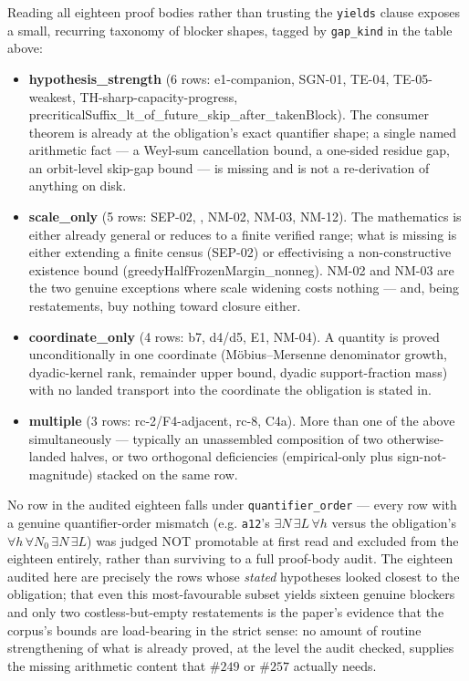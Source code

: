 \documentclass[11pt]{article}
\DeclareRobustCommand{\breakcode}[1]{\seqsplit{#1}}
\theoremstyle{breakplain}
\theoremstyle{breakdefinition}
\theoremstyle{breakdefinition}
\begin{document}
Reading all eighteen proof bodies rather than trusting the \texttt{yields}
clause exposes a small, recurring taxonomy of blocker shapes, tagged by
\texttt{gap\_kind} in the table above:

\begin{itemize}[nosep]
\item \textbf{hypothesis\_strength} (6 rows: e1-companion, SGN-01, TE-04,
TE-05-weakest, TH-sharp-capacity-progress,
precriticalSuffix\_lt\_of\_future\_skip\_after\_takenBlock). The consumer
theorem is already at the obligation's exact quantifier shape; a single
named arithmetic fact — a Weyl-sum cancellation bound, a one-sided residue
gap, an orbit-level skip-gap bound — is missing and is not a re-derivation
of anything on disk.
\item \textbf{scale\_only} (5 rows: SEP-02, \texttt{\breakcode{greedyHalfFrozenMargin\_nonneg}},
NM-02, NM-03, NM-12). The mathematics is either already general or reduces
to a finite verified range; what is missing is either extending a finite
census (SEP-02) or effectivising a non-constructive existence bound
(greedyHalfFrozenMargin\_nonneg). NM-02 and NM-03 are the two genuine
exceptions where scale widening costs nothing — and, being restatements, buy
nothing toward closure either.
\item \textbf{coordinate\_only} (4 rows: b7, d4/d5, E1, NM-04). A quantity
is proved unconditionally in one coordinate (Möbius--Mersenne denominator
growth, dyadic-kernel rank, remainder upper bound, dyadic support-fraction
mass) with no landed transport into the coordinate the obligation is stated
in.
\item \textbf{multiple} (3 rows: rc-2/F4-adjacent, rc-8, C4a). More than
one of the above simultaneously — typically an unassembled composition of
two otherwise-landed halves, or two orthogonal deficiencies (empirical-only
plus sign-not-magnitude) stacked on the same row.
\end{itemize}

No row in the audited eighteen falls under \texttt{quantifier\_order} — every
row with a genuine quantifier-order mismatch (e.g. \texttt{a12}'s
\(\exists N\,\exists L\,\forall h\) versus the obligation's
\(\forall h\,\forall N_0\,\exists N\,\exists L\)) was judged NOT promotable
at first read and excluded from the eighteen entirely, rather than surviving
to a full proof-body audit. The eighteen audited here are precisely the rows
whose \emph{stated} hypotheses looked closest to the obligation; that even
this most-favourable subset yields sixteen genuine blockers and only two
costless-but-empty restatements is the paper's evidence that the corpus's
bounds are load-bearing in the strict sense: no amount of routine
strengthening of what is already proved, at the level the audit checked,
supplies the missing arithmetic content that \(\#249\) or \(\#257\)
actually needs.
\end{document}
